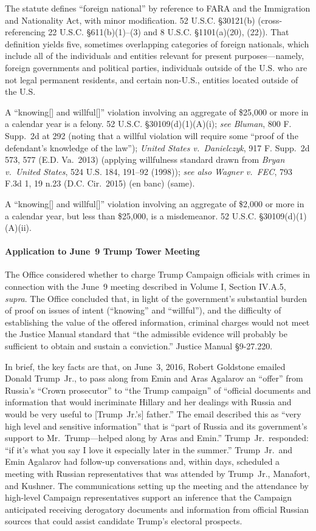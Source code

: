 The statute defines ``foreign national'' by reference to FARA and the Immigration and Nationality Act, with minor modification.
52 U.S.C. \S 30121(b) (cross-referencing 22 U.S.C. \S 611(b)(1)--(3) and 8 U.S.C. \S 1101(a)(20), (22)).
That definition yields five, sometimes overlapping categories of foreign nationals, which include all of the individuals and entities relevant for present purposes---namely, foreign governments and political parties, individuals outside of the U.S. who are not legal permanent residents, and certain non-U.S., entities located outside of the U.S.

A ``knowing[] and willful[]'' violation involving an aggregate of \$25,000 or more in a calendar year is a felony.
52 U.S.C. \S 30109(d)(1)(A)(i); \textit{see Bluman}, 800 F. Supp.~2d at 292 (noting that a willful violation will require some ``proof of the defendant's knowledge of the law''); \textit{United States v.\ Danielczyk}, 917 F. Supp.~2d 573, 577 (E.D. Va.~2013) (applying willfulness standard drawn from \textit{Bryan v.\ United States}, 524 U.S. 184, 191--92 (1998)); \textit{see also Wagner v.\ FEC}, 793 F.3d 1, 19 n.23 (D.C. Cir.~2015) (en banc) (same).

A ``knowing[] and willful[]'' violation involving an aggregate of \$2,000 or more in a calendar year, but less than \$25,000, is a misdemeanor.
52 U.S.C. \S 30109(d)(1)(A)(ii).

\paragraph{Application to June~9 Trump Tower Meeting}
The Office considered whether to charge Trump Campaign officials with crimes in connection with the June~9 meeting described in Volume I, Section IV.A.5, \textit{supra}.
The Office concluded that, in light of the government's substantial burden of proof on issues of intent (``knowing'' and ``willful''), and the difficulty of establishing the value of the offered information, criminal charges would not meet the Justice Manual standard that ``the admissible evidence will probably be sufficient to obtain and sustain a conviction.''
Justice Manual \S 9-27.220.

In brief, the key facts are that, on June~3, 2016, Robert Goldstone emailed Donald Trump~Jr., to pass along from Emin and Aras Agalarov an ``offer'' from Russia's ``Crown prosecutor'' to ``the Trump campaign'' of ``official documents and information that would incriminate Hillary and her dealings with Russia and would be very useful to [Trump~Jr.'s] father.''
The email described this as ``very high level and sensitive information'' that is ``part of Russia and its government's support to Mr.~Trump---helped along by Aras and Emin.''
Trump~Jr.\ responded: ``if it's what you say I love it especially later in the summer.''
Trump~Jr.\ and Emin Agalarov had follow-up conversations and, within days, scheduled a meeting with Russian representatives that was attended by Trump~Jr., Manafort, and Kushner.
The communications setting up the meeting and the attendance by high-level Campaign representatives support an inference that the Campaign anticipated receiving derogatory documents and information from official Russian sources that could assist candidate Trump's electoral prospects.


